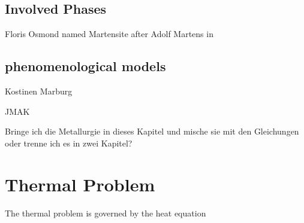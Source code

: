 \subsection{Involved Phases}
Floris Osmond named Martensite after Adolf Martens in \cite{osmond_microscopic_1904}

\subsection{phenomenological models}
Kostinen Marburg

JMAK 


Bringe ich die Metallurgie in dieses Kapitel und mische sie mit den Gleichungen oder trenne ich es in zwei Kapitel? 


\section{Thermal Problem}

The thermal problem is governed by the heat equation 
